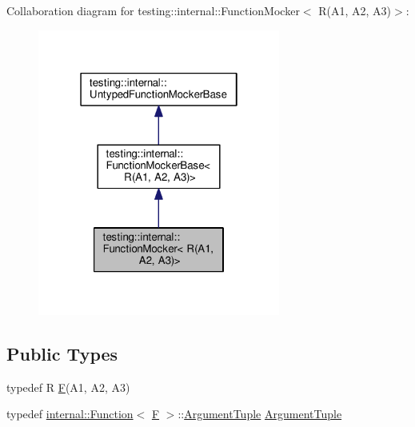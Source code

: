 Collaboration diagram for testing\+:\+:internal\+:\+:Function\+Mocker$<$ R(A1, A2, A3)$>$\+:\nopagebreak
\begin{figure}[H]
\begin{center}
\leavevmode
\includegraphics[width=226pt]{classtesting_1_1internal_1_1FunctionMocker_3_01R_07A1_00_01A2_00_01A3_08_4__coll__graph}
\end{center}
\end{figure}
\subsection*{Public Types}
\begin{DoxyCompactItemize}
\item 
typedef R \hyperlink{classtesting_1_1internal_1_1FunctionMocker_3_01R_07A1_00_01A2_00_01A3_08_4_a8c471830f963b8012785eb3eeca2cc9c}{F}(A1, A2, A3)
\item 
typedef \hyperlink{structtesting_1_1internal_1_1Function}{internal\+::\+Function}$<$ \hyperlink{classtesting_1_1internal_1_1FunctionMocker_3_01R_07A1_00_01A2_00_01A3_08_4_a8c471830f963b8012785eb3eeca2cc9c}{F} $>$\+::\hyperlink{classtesting_1_1internal_1_1FunctionMocker_3_01R_07A1_00_01A2_00_01A3_08_4_a347dcf4c054a5f1fbd0e2f0ad1c5e2f3}{Argument\+Tuple} \hyperlink{classtesting_1_1internal_1_1FunctionMocker_3_01R_07A1_00_01A2_00_01A3_08_4_a347dcf4c054a5f1fbd0e2f0ad1c5e2f3}{Argument\+Tuple}
\end{DoxyCompactItemize}
